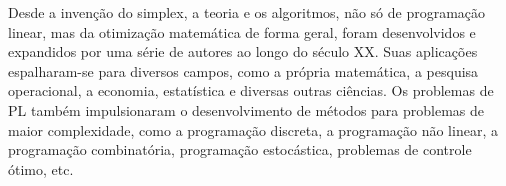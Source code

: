 Desde a invenção do simplex, a teoria e os algoritmos, não só de programação
linear, mas da otimização matemática de forma geral, foram desenvolvidos e
expandidos por uma série de autores ao longo do século XX. Suas aplicações
espalharam-se para diversos campos, como a própria matemática, a pesquisa
operacional, a economia, estatística e diversas outras ciências. Os problemas
de PL também impulsionaram o desenvolvimento de métodos para problemas de maior
complexidade, como a programação discreta, a programação não linear, a
programação combinatória, programação estocástica, problemas de controle ótimo,
etc.
